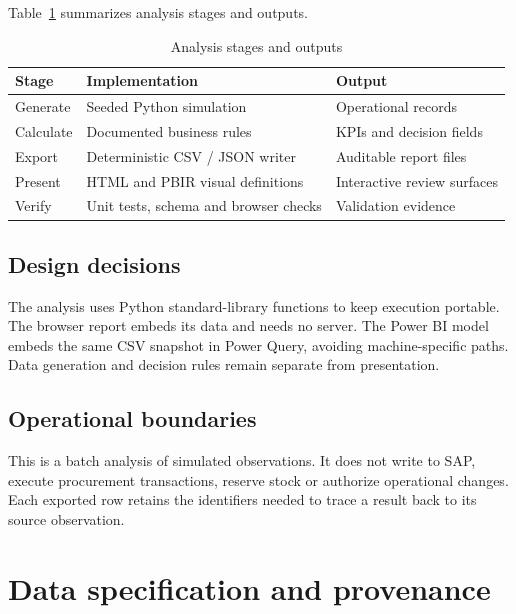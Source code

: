 \documentclass[conference,letterpaper]{IEEEtran}
\begin{document}
Table~\ref{tab:1} summarizes analysis stages and outputs.

\begin{table}[H]
\caption{Analysis stages and outputs}\label{tab:1}
\centering\footnotesize
\setlength{\tabcolsep}{3pt}
\begin{tabularx}{\columnwidth}{>{\raggedright\arraybackslash}X >{\raggedright\arraybackslash}X >{\raggedright\arraybackslash}X}
\hline
\textbf{Stage} & \textbf{Implementation} & \textbf{Output} \\
\hline
Generate & Seeded Python simulation & Operational records \\
Calculate & Documented business rules & KPIs and decision fields \\
Export & Deterministic CSV / JSON writer & Auditable report files \\
Present & HTML and PBIR visual definitions & Interactive review surfaces \\
Verify & Unit tests, schema and browser checks & Validation evidence \\
\hline
\end{tabularx}
\end{table}

\subsection{Design decisions}

The analysis uses Python standard-library functions to keep execution portable. The browser report embeds its data and needs no server. The Power BI model embeds the same CSV snapshot in Power Query, avoiding machine-specific paths. Data generation and decision rules remain separate from presentation.


\subsection{Operational boundaries}

This is a batch analysis of simulated observations. It does not write to SAP, execute procurement transactions, reserve stock or authorize operational changes. Each exported row retains the identifiers needed to trace a result back to its source observation.


\section{Data specification and provenance}
\end{document}
